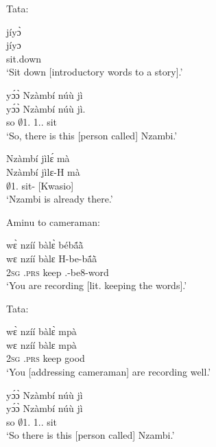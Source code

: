 \noindent Tata:

\begin{exe}[(N234)]
\exN\label{n01}
  \glll    jíyɔ̀ \\
           jíyɔ \\
             sit.down \\
    \trans `Sit down [introductory words to a story].'
 
\exN\label{n02}
  \glll     yɔ́ɔ̀ Nzàmbí núù jì  \\
           yɔ́ɔ̀ Nzàmbí núù jì. \\
              so $\emptyset$1.{\PN} 1.{\DEM}.{\PROX} sit   \\
    \trans `So, there is this [person called] Nzambi.'
 
\exN\label{n03}
  \glll   Nzàmbí jìlɛ́ mà \\
         Nzàmbí jìlɛ-H mà \\
            $\emptyset$1.{\PN} sit-{\R} {\COMPL}[Kwasio]     \\
    \trans `Nzambi is already there.'
\end{exe}

\noindent Aminu to cameraman:

\begin{exe}[(N234)]
\exN\label{n04} 
  \glll   wɛ̀ nzíí bàlɛ̀ bébã́ã̀ \\
      wɛ nzíí bàlɛ H-be-bã́ã̀ \\
            2\textsc{sg} {\PROG}.\textsc{prs} keep {\OBJ}.{\LINK}-be8-word \\
    \trans `You are recording [lit. keeping the words].'
\end{exe}

\noindent Tata:

\begin{exe}[(N234)] 
\exN\label{n05} 
  \glll  wɛ̀ nzíí bàlɛ̀ mpà \\
       wɛ nzíí bàlɛ mpà \\
           2\textsc{sg} {\PROG}.\textsc{prs} keep good\\
    \trans `You [addressing cameraman] are recording well.'
     
\exN\label{n06}
  \glll  yɔ́ɔ̀ Nzàmbí núù jì  \\
         yɔ́ɔ̀ Nzàmbí núù jì \\
          so $\emptyset$1.{\PN} 1.{\DEM}.{\PROX} sit \\
    \trans `So there is this [person called] Nzambi.'
\end{exe}

